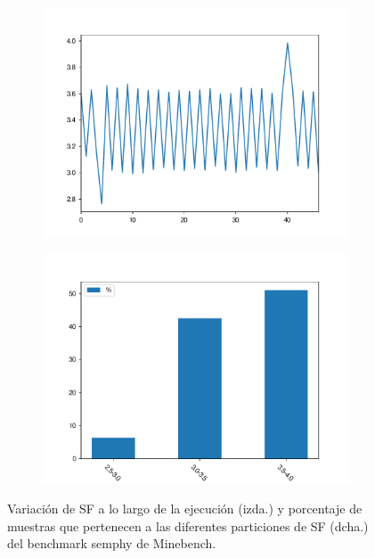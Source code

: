 \begin{figure}
\centering
\begin{subfigure}{.5\textwidth}
  \centering
  \includegraphics[width=.99\linewidth]{sf_over_time_semphy_mb.pdf}
\end{subfigure}%
\begin{subfigure}{.5\textwidth}
  \centering
  \includegraphics[width=.99\linewidth]{sf_partitions_semphy_mb.pdf}
\end{subfigure}
\caption{Variación de SF a lo largo de la ejecución (izda.) y porcentaje de muestras que pertenecen a las diferentes particiones de SF (dcha.) del benchmark semphy de Minebench.}
\label{fig:b2}
\end{figure}
